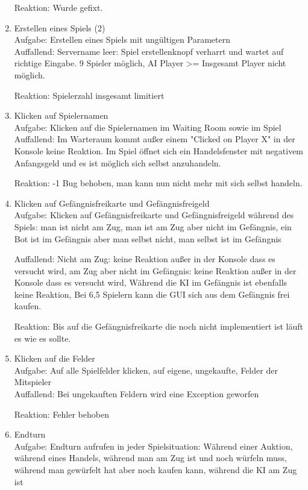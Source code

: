 \documentclass[a4paper,10pt]{article}
\begin{document}
\begin{enumerate}
Reaktion: Wurde gefixt.
\item Erstellen eines Spiels (2) \\
Aufgabe: Erstellen eines Spiels mit ungültigen Parametern\\

Auffallend: Servername leer: Spiel erstellenknopf verharrt und wartet auf richtige Eingabe. 9 Spieler möglich, AI Player >= Insgesamt Player nicht möglich.

Reaktion: Spielerzahl insgesamt limitiert
\item Klicken auf Spielernamen \\
Aufgabe: Klicken auf die Spielernamen im Waiting Room sowie im Spiel\\

Auffallend: Im Warteraum kommt außer einem "Clicked on Player X" in der Konsole keine Reaktion.
Im Spiel öffnet sich ein Handelsfenster mit negativem Anfangsgeld und es ist möglich sich selbst anzuhandeln.

Reaktion: -1 Bug behoben, man kann nun nicht mehr mit sich selbst handeln.
\item Klicken auf Gefängnisfreikarte und Gefängnisfreigeld \\
Aufgabe: Klicken auf Gefängnisfreikarte und Gefängnisfreigeld während des Spiels: man ist nicht am Zug, man ist am Zug aber nicht im Gefängnis, ein Bot ist im Gefängnis aber man selbst nicht, man selbst ist im Gefängnis

Auffallend: Nicht am Zug: keine Reaktion außer in der Konsole dass es versucht wird, am Zug aber nicht im Gefängnis: keine Reaktion außer in der Konsole dass es versucht wird, Während die KI im Gefängnis ist ebenfalls keine Reaktion, Bei 6,5 Spielern kann die GUI sich aus dem Gefängnis frei kaufen.

Reaktion: Bis auf die Gefängnisfreikarte die noch nicht implementiert ist läuft es wie es sollte.
\item Klicken auf die Felder \\
Aufgabe: Auf alle Spielfelder klicken, auf eigene, ungekaufte, Felder der Mitspieler\\

Auffallend: Bei ungekauften Feldern wird eine Exception geworfen

Reaktion: Fehler behoben
\item Endturn\\
Aufgabe: Endturn aufrufen in jeder Spielsituation: Während einer Auktion, während eines Handels, während man am Zug ist und noch würfeln muss, während man gewürfelt hat aber noch kaufen kann, während die KI am Zug ist


\end{enumerate}
\end{document}
